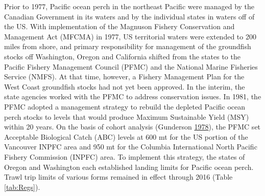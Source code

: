 \documentclass[12pt,]{article}
\begin{document}
Prior to 1977, Pacific ocean perch in the northeast Pacific were managed
by the Canadian Government in its waters and by the individual states in
waters off of the US. With implementation of the Magnuson Fishery
Conservation and Management Act (MFCMA) in 1977, US territorial waters
were extended to 200 miles from shore, and primary responsibility for
management of the groundfish stocks off Washington, Oregon and
California shifted from the states to the Pacific Fishery Management
Council (PFMC) and the National Marine Fisheries Service (NMFS). At that
time, however, a Fishery Management Plan for the West Coast groundfish
stocks had not yet been approved. In the interim, the state agencies
worked with the PFMC to address conservation issues. In 1981, the PFMC
adopted a management strategy to rebuild the depleted Pacific ocean
perch stocks to levels that would produce Maximum Sustainable Yield
(MSY) within 20 years. On the basis of cohort analysis (Gunderson
\protect\hyperlink{ref-gunderson_results_1978}{1978}), the PFMC set
Acceptable Biological Catch (ABC) levels at 600 mt for the US portion of
the Vancouver INPFC area and 950 mt for the Columbia International North
Pacific Fishery Commission (INPFC) area. To implement this strategy, the
states of Oregon and Washington each established landing limits for
Pacific ocean perch. Trawl trip limits of various forms remained in
effect through 2016 (Table \ref{tab:Regs}).
\end{document}
